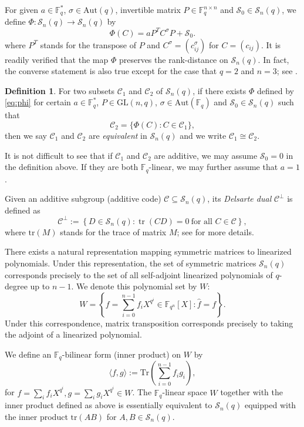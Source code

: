 \documentclass{amsart}
\theoremstyle{plain}
\theoremstyle{definition}
\newtheorem{definition}[theorem]{Definition}
\newcommand{\F}{\mathbb F}
\newcommand{\fq}{\mathbb{F}_{q}}
\newcommand{\cC}{\mathcal C}
\newcommand{\sS}{\mathscr S}
\newcommand{\Aut}{\mathrm{Aut}}
\newcommand{\GL}{\mathrm{GL}}
\newcommand{\Tr}{ \ensuremath{ \mathrm{Tr}}}
\begin{document}
	For given $a \in \fq^*$, $\sigma\in \Aut(q)$, invertible matrix $P\in \F_q^{n\times n}$ and $\sS_0 \in \sS_n(q)$, we define $\Phi:\sS_n(q)\rightarrow \sS_n(q)$ by
	\begin{equation}\label{eq:phi}
		\Phi (C)=aP^TC^\sigma P+\sS_0.
	\end{equation}
	where $P^T$ stands for the transpose of $P$ and $C^\sigma=(c_{ij}^\sigma)$ for $C= (c_{ij})$. It is readily verified that the map $\Phi$ preserves the rank-distance on $\sS_n(q)$. In fact, the converse statement is also true except for the case that $q=2$ and $n=3$; see \cite{WZ}. 
	\begin{definition}
		For two subsets $\cC_1$ and $\cC_2$ of $\sS_n(q)$, if there exists $\Phi$ defined by \eqref{eq:phi} for certain $a\in \F_q^*$, $P\in \GL(n,q)$, $\sigma\in \Aut(\F_q)$ and $\sS_0\in \sS_n(q)$  such that
		\[\cC_2=\{\Phi(C):C\in \cC_1\},\]
		then we say $\cC_1$ and $\cC_2$ are \emph{equivalent} in $\sS_n (q)$ and we write $\cC_1 \cong \cC_2$.
	\end{definition}
	
	It is not difficult to see that if $\cC_1$ and $\cC_2$ are additive, we may assume $\sS_0=0$ in the definition above. If they are both $\F_q$-linear, we may further assume that $a=1$.
	

		Given an additive subgroup (additive code) $\mathcal{C} \subseteq \mathscr{S}_n(q)$, its \emph{Delsarte dual} $\mathcal{C}^{\perp}$ is defined as
		\[
		\mathcal{C}^{\perp} := \left\{ D \in \mathscr{S}_n(q) : \operatorname{tr}(C D) = 0 \ \text{for all } C \in \mathcal{C} \right\},
		\]
		where $\mathrm{tr}(M)$ stands for the trace of matrix $M$; see \cite{Schmidt_2015} for more details.
		
		There exists a natural representation mapping symmetric matrices to linearized polynomials. Under this representation, the set of symmetric matrices $\mathscr{S}_n(q)$ corresponds precisely to the set of all self-adjoint linearized polynomials of $q$-degree up to $n-1$. We denote this polynomial set by $W$:
		\[
		W= \left\{f = \sum_{i=0}^{n-1} f_i X^{q^i} \in \mathbb{F}_{q^n}[X] : \hat{f}=f \right\}.
		\]
		Under this correspondence, matrix transposition corresponds precisely to taking the adjoint of a linearized polynomial.  
		
		We define an $\mathbb{F}_q$-bilinear form (inner product) on $W$ by
		\[
		\langle f, g \rangle := \Tr\left(\sum_{i=0}^{n-1} f_i g_i \right),
		\]
		for $f=\sum_{i} f_i X^{q^{i}}, g=\sum_{i} g_i X^{q^{i}} \in W$.
		The $\F_q$-linear space $W$ together with the inner product defined as above is essentially equivalent to $\mathscr{S}_n(q)$ equipped with the inner product $\mathrm{tr}(AB)$ for $A,B\in \mathscr{S}_n(q)$.
		
\end{document}
